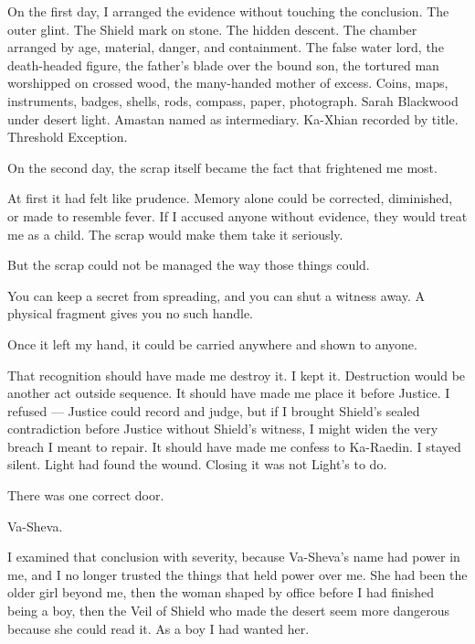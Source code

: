 On the first day, I arranged the evidence without touching the conclusion. The outer glint. The Shield mark on stone. The hidden descent. The chamber arranged by age, material, danger, and containment. The false water lord, the death-headed figure, the father's blade over the bound son, the tortured man worshipped on crossed wood, the many-handed mother of excess. Coins, maps, instruments, badges, shells, rods, compass, paper, photograph. Sarah Blackwood under desert light. Amastan named as intermediary. Ka-Xhian recorded by title. Threshold Exception.\par

On the second day, the scrap itself became the fact that frightened me most.\par

At first it had felt like prudence. Memory alone could be corrected, diminished, or made to resemble fever. If I accused anyone without evidence, they would treat me as a child. The scrap would make them take it seriously.\par

But the scrap could not be managed the way those things could.\par

You can keep a secret from spreading, and you can shut a witness away. A physical fragment gives you no such handle.\par

Once it left my hand, it could be carried anywhere and shown to anyone.\par

That recognition should have made me destroy it. I kept it. Destruction would be another act outside sequence. It should have made me place it before Justice. I refused --- Justice could record and judge, but if I brought Shield's sealed contradiction before Justice without Shield's witness, I might widen the very breach I meant to repair. It should have made me confess to Ka-Raedin. I stayed silent. Light had found the wound. Closing it was not Light's to do.\par

There was one correct door.\par

Va-Sheva.\par

I examined that conclusion with severity, because Va-Sheva's name had power in me, and I no longer trusted the things that held power over me. She had been the older girl beyond me, then the woman shaped by office before I had finished being a boy, then the Veil of Shield who made the desert seem more dangerous because she could read it. As a boy I had wanted her.\par

